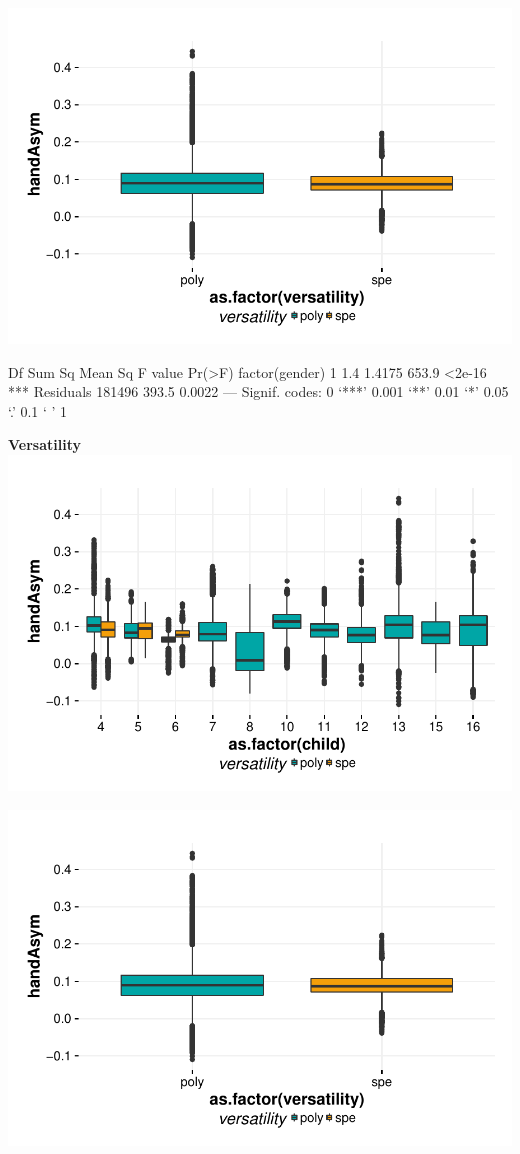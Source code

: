 \documentclass{article}
\begin{document}
\includegraphics{features-plot_handAsymmetry_gender_quiz}

\begin{Schunk}
\begin{Soutput}
                   Df Sum Sq Mean Sq F value Pr(>F)    
factor(gender)      1    1.4  1.4175   653.9 <2e-16 ***
Residuals      181496  393.5  0.0022                   
---
Signif. codes:  0 ‘***’ 0.001 ‘**’ 0.01 ‘*’ 0.05 ‘.’ 0.1 ‘ ’ 1
\end{Soutput}
\end{Schunk}

\textbf{Versatility}
\includegraphics{features-plot_handAsymmetry_child_versatility_quiz}

\includegraphics{features-plot_handAsymmetry_gender_quiz}
\end{document}
